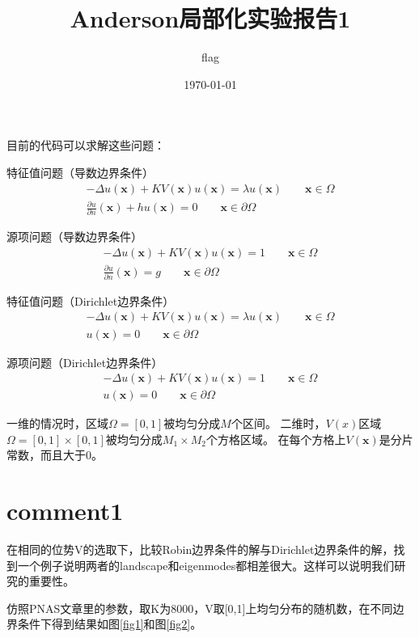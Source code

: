 \documentclass[UTF8,12pt]{article}
\title{Anderson局部化实验报告1}
\author{flag}
\date{\today}
\begin{document}
    
\maketitle

目前的代码可以求解这些问题：

特征值问题（导数边界条件）
\begin{eqnarray}
- \Delta u(\mathbf{x}) + KV(\mathbf{x}) u(\mathbf{x}) = \lambda u(\mathbf{x}) \qquad \mathbf{x} \in \Omega \\
\frac{\partial u}{\partial n}(\mathbf{x}) + h u(\mathbf{x}) = 0 \qquad \mathbf{x} \in \partial \Omega
\end{eqnarray}

源项问题（导数边界条件）
\begin{eqnarray}
- \Delta u(\mathbf{x}) + KV(\mathbf{x}) u(\mathbf{x}) = 1 \qquad \mathbf{x} \in \Omega \\
\frac{\partial u}{\partial n}(\mathbf{x}) = g \qquad \mathbf{x} \in \partial \Omega
\end{eqnarray}

特征值问题（Dirichlet边界条件）
\begin{eqnarray}
- \Delta u(\mathbf{x}) + KV(\mathbf{x}) u(\mathbf{x}) = \lambda u(\mathbf{x}) \qquad \mathbf{x} \in \Omega \\
u(\mathbf{x}) = 0 \qquad \mathbf{x} \in \partial \Omega
\end{eqnarray}

源项问题（Dirichlet边界条件）
\begin{eqnarray}
- \Delta u(\mathbf{x}) + KV(\mathbf{x}) u(\mathbf{x}) = 1 \qquad \mathbf{x} \in \Omega \\
u(\mathbf{x}) = 0 \qquad \mathbf{x} \in \partial \Omega
\end{eqnarray}

一维的情况时，区域$\Omega=[0,1]$被均匀分成$M$个区间。
二维时，$V(x)$区域$\Omega=[0,1] \times [0,1]$被均匀分成$M_1 \times M_2$个方格区域。
在每个方格上$V(\mathbf{x})$是分片常数，而且大于0。

\section{comment1}
    
在相同的位势V的选取下，比较Robin边界条件的解与Dirichlet边界条件的解，找到一个例子说明两者的landscape和eigenmodes都相差很大。这样可以说明我们研究的重要性。

仿照PNAS文章里的参数，取K为8000，V取[0,1]上均匀分布的随机数，在不同边界条件下得到结果如图\ref{fig1}和图\ref{fig2}。
\end{document}

